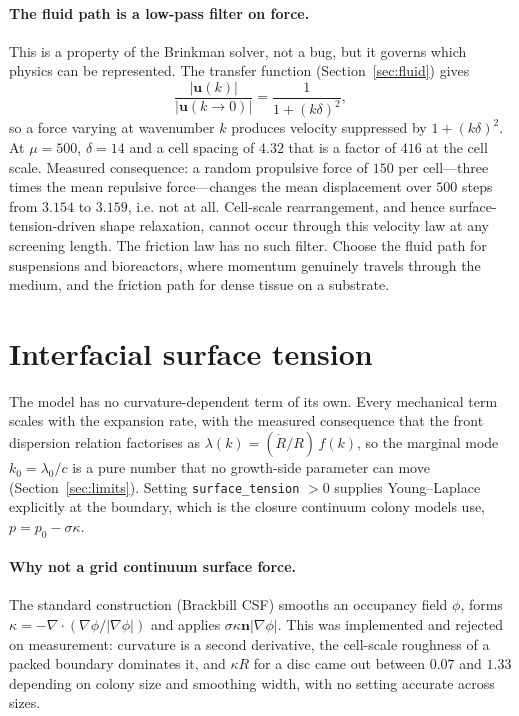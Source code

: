 \documentclass[11pt]{article}
\newcommand{\vu}{\bm{u}}
\begin{document}
\paragraph{The fluid path is a low-pass filter on force.} This is a property of
the Brinkman solver, not a bug, but it governs which physics can be represented.
The transfer function (Section~\ref{sec:fluid}) gives
\begin{equation}
  \frac{\lvert\vu(k)\rvert}{\lvert\vu(k\!\to\!0)\rvert}
  = \frac{1}{1+(k\delta)^2},
\end{equation}
so a force varying at wavenumber $k$ produces velocity suppressed by
$1+(k\delta)^2$. At $\mu=500$, $\delta=14$ and a cell spacing of $4.32$ that is a
factor of $416$ at the cell scale. Measured consequence: a random propulsive
force of $150$ per cell---three times the mean repulsive force---changes the mean
displacement over $500$ steps from $3.154$ to $3.159$, i.e. not at all. Cell-scale
rearrangement, and hence surface-tension-driven shape relaxation, cannot occur
through this velocity law at any screening length. The friction law has no such
filter. Choose the fluid path for suspensions and bioreactors, where momentum
genuinely travels through the medium, and the friction path for dense tissue on a
substrate.

\section{Interfacial surface tension}\label{sec:surften}

The model has no curvature-dependent term of its own. Every mechanical term
scales with the expansion rate, with the measured consequence that the front
dispersion relation factorises as
$\lambda(k)=(\dot R/R)\,f(k)$, so the marginal mode $k_0=\lambda_0/c$ is a pure
number that no growth-side parameter can move (Section~\ref{sec:limits}).
Setting \texttt{surface\_tension} $>0$ supplies Young--Laplace explicitly at the
boundary, which is the closure continuum colony models use,
$p = p_0 - \sigma\kappa$.

\paragraph{Why not a grid continuum surface force.} The standard construction
(Brackbill CSF) smooths an occupancy field $\phi$, forms
$\kappa=-\nabla\!\cdot\!(\nabla\phi/\lvert\nabla\phi\rvert)$ and applies
$\sigma\kappa\bm{n}\lvert\nabla\phi\rvert$. This was implemented and rejected on
measurement: curvature is a second derivative, the cell-scale roughness of a
packed boundary dominates it, and $\kappa R$ for a disc came out between $0.07$
and $1.33$ depending on colony size and smoothing width, with no setting accurate
across sizes.
\end{document}
